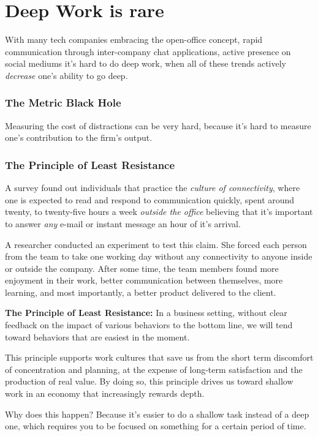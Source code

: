 \documentclass[12pt, letterpaper]{article}
\begin{document}
\section*{Deep Work is rare}

With many tech companies embracing the open-office concept, rapid communication through inter-company chat applications, active presence on social mediums it's hard to do deep work, when all of these trends actively \emph{decrease} one's ability to go deep.

\subsubsection*{The Metric Black Hole}
Measuring the cost of distractions can be very hard, because it's hard to measure one's contribution to the firm's output.

\subsubsection*{The Principle of Least Resistance}

A survey found out individuals that practice the \emph{culture of connectivity}, where one is expected to read and respond to communication quickly, spent around twenty, to twenty-five hours a week \emph{outside the office} believing that it's important to answer \emph{any} e-mail or instant message an hour of it's arrival.

A researcher conducted an experiment to test this claim. She forced each person from the team to take one working day without any connectivity to anyone inside or outside the company. After some time, the team members found more enjoyment in their work, better communication between themselves, more learning, and most importantly, a better product delivered to the client.

\textbf{The Principle of Least Resistance:} In a business setting, without clear feedback on the impact of various behaviors to the bottom line, we will tend toward behaviors that are easiest in the moment.

This principle supports work cultures that save us from the short term discomfort of concentration and planning, at the expense of long-term satisfaction and the production of real value. By doing so, this principle drives us toward shallow work in an economy that increasingly rewards depth.

Why does this happen? Because it's easier to do a shallow task instead of a deep one, which requires you to be focused on something for a certain period of time.
\end{document}
